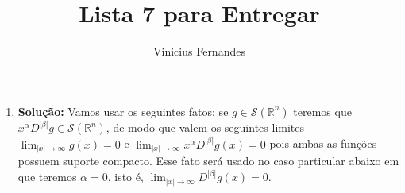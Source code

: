 \documentclass{article}
\begin{document}
	
	\title{Lista 7 para Entregar}
	\author{Vinicius Fernandes}
	
	\maketitle
	
	\begin{enumerate}
		
		\item \textbf{Solução:} Vamos usar os seguintes fatos: se $g \in \mathcal{S}(\mathbb{R}^{n})$ teremos que $x^{\alpha} D^{|\beta|}g \in \mathcal{S}(\mathbb{R}^{n})$, de modo que valem os seguintes limites $\lim_{|x| \to \infty} g(x) = 0$ e $\lim_{|x| \to \infty} x^{\alpha} D^{|\beta|}g(x) = 0$ pois ambas as funções possuem suporte compacto. Esse fato será usado no caso particular abaixo em que teremos $\alpha = 0$, isto é, $\lim_{|x| \to \infty} D^{|\beta|}g(x) = 0$.
		

\end{enumerate}
\end{document}

